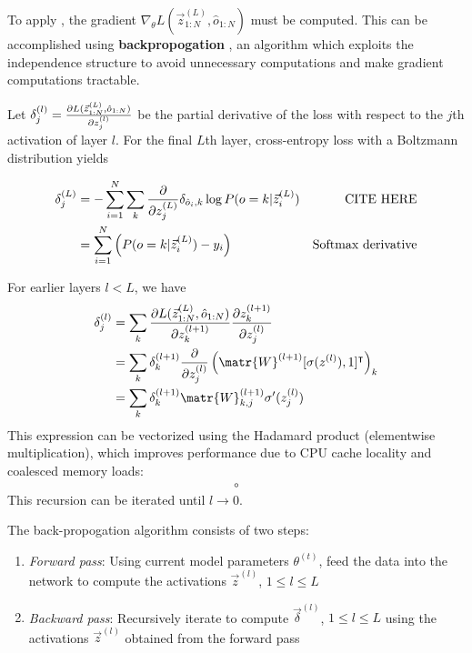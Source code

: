 To apply , the gradient $\nabla_\theta
L(\vec{z}^{(L)}_{1:N}, \hat{o}_{1:N})$ must be computed. This can be
accomplished using \textbf{backpropogation} , an algorithm which
exploits the independence structure to avoid unnecessary computations and make
gradient computations tractable.

Let $\delta^{(l)}_{j} = \frac{\partial L(\vec{z}^{(L)}_{1:N}, \hat{o}_{1:N})}{\partial
z^{(l)}_j}$ be the partial derivative of the loss with respect to the $j$th
activation of layer $l$. For the final $L$th layer, cross-entropy loss
with a Boltzmann distribution yields

\begin{align*}
    \delta^{(L)}_{j}
    &= - \sum_{i=1}^{N} \sum_{k} \frac{\partial}{\partial z^{(L)}_j} \delta_{\hat{o}_i,k} \log P(o=k | \vec{z}^{(L)}_i ) &\text{CITE HERE} \\
    &= \sum_{i=1}^{N} \left( P(o=k | \vec{z}^{(L)}_i ) - y_i \right) & \text{Softmax derivative}
\end{align*}

For earlier layers $l < L$, we have
\begin{align}
    \delta^{(l)}_{j}
    &= \sum_k \frac{\pd L(\vec{z}^{(L)}_{1:N}, \hat{o}_{1:N})}{\pd z^{(l+1)}_k}
    \frac{\pd z^{(l+1)}_k}{\pd z^{(l)}_j}\\
    &= \sum_k \delta^{(l+1)}_k
    \frac{\pd}{\pd z^{(l)}_j} \left( \matr{W}^{(l+1)} [\sigma(z^{(l)}), 1]^\tp \right)_k \\
    &= \sum_k \delta^{(l+1)}_k
    \matr{W}^{(l+1)}_{k,j} \sigma'(z^{(l)}_j) \label{eq:backprop}
\end{align}
This expression can be vectorized using the Hadamard product (elementwise multiplication), which
improves performance due to CPU cache locality and coalesced memory loads: 
\begin{align}
    \circ
\end{align}
This recursion can be iterated until $l \to 0$.

The back-propogation algorithm consists of two steps:
\begin{enumerate}
    \item \emph{Forward pass}: Using current model parameters $\theta^{(t)}$,
        feed the data into the network to compute the activations $\vec{z}^{(l)}$,
        $1 \leq l \leq L$
    \item \emph{Backward pass}: Recursively iterate 
        to compute $\vec{\delta}^{(l)}$, $1 \leq l \leq L$ using the activations
        $\vec{z}^{(l)}$ obtained from the forward pass
\end{enumerate}

